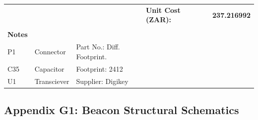 \begin{landscape}
\begin{table}[]
\begin{tabular}{llllllll}
               &               &                            &                                 & \textbf{Unit Cost (ZAR):}            &                      &                 & \textbf{237.216992}  \\
               &               &                            &                                 &                                      &                      &                 &                      \\
\textbf{Notes} &               &                            &                                 &                                      &                      &                 &                      \\
P1             & Connector     & Part No.: Diff. Footprint. &                                 &                                      &                      &                 &                      \\
C35            & Capacitor     & Footprint: 2412            &                                 &                                      &                      &                 &                      \\
U1             & Transciever   & Supplier: Digikey          &                                 &                                      &                      &                 &                     
\end{tabular}
\end{table}
\end{landscape}

\newpage
\vspace*{\fill}
\begin{center}
\subsection*{Appendix G1: Beacon Structural Schematics}
\end{center}
\vspace*{\fill}


